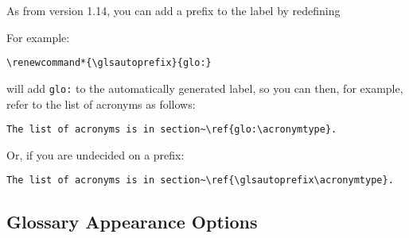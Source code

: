 \documentclass{nlctdoc}
\begin{document}
\begin{description}
As from version 1.14, you can add a prefix to the label by
redefining 
\begin{definition}[\DescribeMacro{\glsautoprefix}]
\end{definition}
For example:
\begin{verbatim}
\renewcommand*{\glsautoprefix}{glo:}
\end{verbatim}
will add \texttt{glo:} to the automatically generated label, so
you can then, for example, refer to the list of acronyms as follows:
\begin{verbatim}
The list of acronyms is in section~\ref{glo:\acronymtype}.
\end{verbatim}
Or, if you are undecided on a prefix:
\begin{verbatim}
The list of acronyms is in section~\ref{\glsautoprefix\acronymtype}.
\end{verbatim}

\end{description}

\subsection{Glossary Appearance Options}
\label{sec:pkgopts-printglos}
\end{document}
